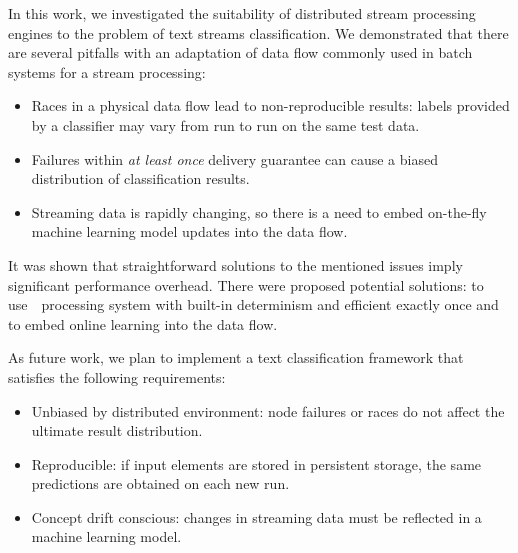 \label {fs-conclusion}

In this work, we investigated the suitability of distributed stream processing engines to the problem of text streams classification. We demonstrated that there are several pitfalls with an adaptation of data flow commonly used in batch systems for a stream processing:

\begin{itemize}
    \item Races in a physical data flow lead to non-reproducible results: labels provided by a classifier may vary from run to run on the same test data. 
    \item Failures within {\em at least once} delivery guarantee can cause a biased distribution of classification results.
    \item Streaming data is rapidly changing, so there is a need to embed on-the-fly machine learning model updates into the data flow. 
\end{itemize}

It was shown that straightforward solutions to the mentioned issues imply significant performance overhead. There were proposed potential solutions: to use~\FlameStream\ processing system with built-in determinism and efficient exactly once and to embed online learning into the data flow. 

As future work, we plan to implement a text classification framework that satisfies the following requirements:

\begin{itemize}
    \item Unbiased by distributed environment: node failures or races do not affect the ultimate result distribution.
    \item Reproducible: if input elements are stored in persistent storage, the same predictions are obtained on each new run.
    \item Concept drift conscious: changes in streaming data must be reflected in a machine learning model.  
\end{itemize}
